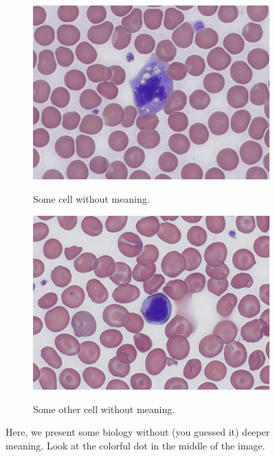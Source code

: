 \begin{figure}[ht]
  \centering
  \begin{subfigure}[b]{0.45\textwidth}
    \centering
    \includegraphics[width=\textwidth]{figures/mono.jpg}
    \label{fig:1:mono}
    \vspace{-0.5cm}
    \caption{Some cell without meaning.}
  \end{subfigure}
  \hfill
  \begin{subfigure}[b]{0.45\textwidth}
    \centering
    \includegraphics[width=\textwidth]{figures/lymph.jpg}
    \label{fig:1:lymph}
    \vspace{-0.5cm}
    \caption{Some other cell without meaning.}
  \end{subfigure}
  \caption{Here, we present some biology without (you guessed it) deeper meaning. Look at the colorful dot in the middle of the image.}
  \label{fig:samples_full_size}
\end{figure}

